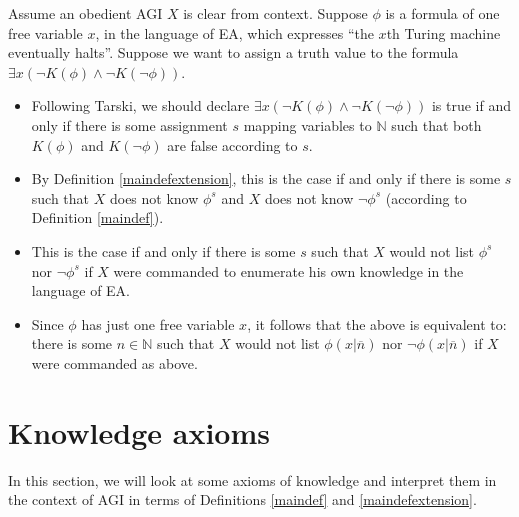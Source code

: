 \documentclass[runningheads]{llncs}
\begin{document}
\begin{example}
  Assume an obedient AGI $X$ is clear from context.
  Suppose $\phi$ is a formula of one free variable $x$, in the language of EA,
  which expresses ``the $x$th Turing machine eventually halts''. Suppose we want to
  assign a truth value to the formula $\exists x (\neg K(\phi)\wedge \neg K(\neg\phi))$.
  \begin{itemize}
  \item Following Tarski, we should declare $\exists x (\neg K(\phi)\wedge\neg K(\neg \phi))$
  is true if and only if there is some assignment $s$ mapping variables to $\mathbb N$
  such that both $K(\phi)$ and $K(\neg\phi)$ are false according to $s$.
  \item By Definition \ref{maindefextension}, this is the case if and only if
  there is some $s$ such that
  $X$ does not know $\phi^s$ and $X$ does not know $\neg\phi^s$
  (according to Definition \ref{maindef}).
  \item
  This is the case if and only if there is some $s$ such that $X$ would not
  list $\phi^s$ nor $\neg\phi^s$ if $X$ were commanded
  to enumerate his own knowledge in the language of EA.
  \item
  Since $\phi$ has just one free variable $x$, it follows that the above is equivalent to:
  there is some $n\in\mathbb N$ such that $X$ would not list $\phi(x|\overline n)$
  nor $\neg\phi(x|\overline n)$
  if $X$ were commanded as above.
  \end{itemize}
\end{example}

\section{Knowledge axioms}

In this section, we will look at some axioms of knowledge and interpret them in the
context of AGI in terms of Definitions \ref{maindef} and \ref{maindefextension}.
\end{document}
